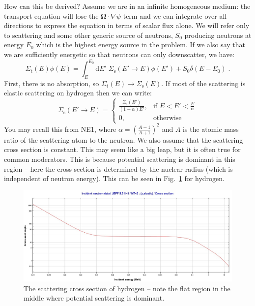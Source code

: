 \documentclass{article}
\begin{document}
How can this be derived? Assume we are in an infinite homogeneous medium: the transport equation will lose the $\mathbf{\Omega}\cdot\nabla \psi$ term and we can integrate over all directions to express the equation in terms of scalar flux alone. We will refer only to scattering and some other generic source of neutrons, $S_0$ producing neutrons at energy $E_0$ which is the highest energy source in the problem. If we also say that we are sufficiently energetic so that neutrons can only downscatter, we have:
\begin{equation}\label{eq:slowing_down}
    \Sigma_\mathrm{t}(E)\phi(E) = \int^{E_0}_E \mathrm{d}E'\;\Sigma_\mathrm{s}(E'\rightarrow E)\phi(E') + S_0\delta(E-E_0)\;\mathrm{.}
\end{equation}
First, there is no absorption, so $\Sigma_\mathrm{t}(E)\rightarrow \Sigma_\mathrm{s}(E)$. If most of the scattering is elastic scattering on hydrogen then we can write:
\begin{equation}
    \Sigma_\mathrm{s}(E'\rightarrow E) = \begin{cases}
    \frac{\Sigma_\mathrm{s}(E')}{(1-\alpha)E'},& \text{if } E<E'<\frac{E}{\alpha}\\
    0,              & \text{otherwise}
\end{cases}
\end{equation}
You may recall this from NE1, where $\alpha = \left(\frac{A-1}{A+1}\right)^2$ and $A$ is the atomic mass ratio of the scattering atom to the neutron. We also assume that the scattering cross section is constant. This may seem like a big leap, but it is often true for common moderators. This is because potential scattering is dominant in this region -- here the cross section is determined by the nuclear radius (which is independent of neutron energy). This can be seen in Fig.~\ref{fig:hydrogen_scatter} for hydrogen. 

\begin{figure}[h!]
	\centering
	\includegraphics[scale=0.3]{./images/hydrogen_XS.jpeg} 
	\caption{The scattering cross section of hydrogen -- note the flat region in the middle where potential scattering is dominant.} 
	\label{fig:hydrogen_scatter}
\end{figure}
\end{document}
